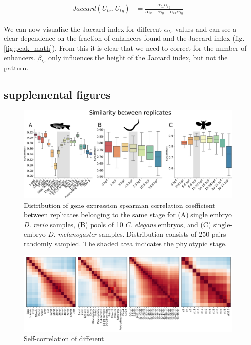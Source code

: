 \begin{align*}
    Jaccard(U_{tx}, U_{ty}) & = \frac{\alpha_{tx} \alpha_{ty}}{\alpha_{tx} + \alpha_{ty} - \alpha_{tx} \alpha_{ty}}
\end{align*}

We can now visualize the Jaccard index for different $\alpha_{ts}$ values and can see a clear dependence on the fraction of enhancers found and the Jaccard index (fig. \ref{fig:peak_math}). From this it is clear that we need to correct for the number of enhancers. $\beta_{ts}$ only influences the height of the Jaccard index, but not the pattern.

\subsection{supplemental figures}
\beginsupplement

\begin{figure}[H]
    \includegraphics[width=\linewidth]{ch4.hourglass/images/within_timepoint.png}
    \caption{Distribution of gene expression spearman correlation coefficient between replicates belonging to the same stage for (A) single embryo \textit{D. rerio} samples, (B) pools of 10 \textit{C. elegans} embryos, and (C) single-embryo \textit{D. melanogaster} samples. Distribution consists of 250 pairs randomly sampled. The shaded area indicates the phylotypic stage. }
    \label{fig:within_timepoint}
\end{figure}

\begin{figure}[H]
    \includegraphics[width=\linewidth]{ch4.hourglass/images/within_species.png}
    \caption{Self-correlation of different}
    \label{fig:withinspecies}
\end{figure}

